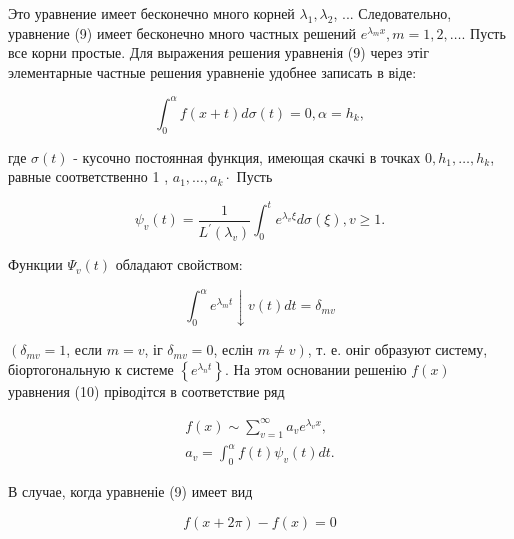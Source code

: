 \documentclass[10pt]{article}
\begin{document}
Это уравнение имеет бесконечно много корней $\lambda_{1}, \lambda_{2}$, ... Следовательно, уравнение (9) имеет бесконечно много частных решений $e^{\lambda_{m} x}, m=1,2, \ldots$. Пусть все корни простые. Для выражения решения уравненія (9) через этіг элементарные частные решения уравненіе удобнее записать в віде:



\[

\int_{0}^{\alpha} f(x+t) d \sigma(t)=0, \alpha=h_{k},

\]



где $\sigma(t)$ - кусочно постоянная функция, имеющая скачкі в точках $0, h_{1}, \ldots, h_{k}$, равные соответственно 1 , $a_{1}, \ldots, a_{k} \cdot$ Пусть



\[

\psi_{v}(t)=\frac{1}{L^{\prime}\left(\lambda_{v}\right)} \int_{0}^{t} e^{\lambda_{v} \xi} d \sigma(\xi), v \geqslant 1 .

\]



Функции $\Psi_{v}(t)$ обладают свойством:



\[

\int_{0}^{\alpha} e^{\lambda_{m} t} \downarrow v(t) d t=\delta_{m v}

\]



$\left(\delta_{m v}=1\right.$, если $m=v$, іг $\delta_{m v}=0$, еслін $\left.m \neq v\right)$, т. е. оніг образуют систему, біортогональную к системе $\left\{e^{\lambda_{n} t}\right\}$. На этом основании решенію $f(x)$ уравнения (10) пріводітся в соответствие ряд



\[

\begin{gathered}

f(x) \sim \sum_{v=1}^{\infty} a_{v} e^{\lambda_{v} x}, \\

a_{v}=\int_{0}^{\alpha} f(t) \psi_{v}(t) d t .

\end{gathered}

\]



В случае, когда уравненіе (9) имеет вид



\[

f(x+2 \pi)-f(x)=0

\]
\end{document}
